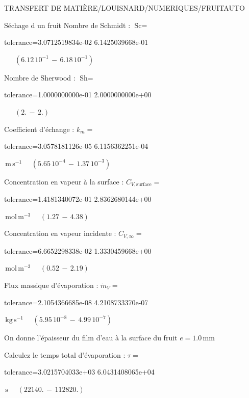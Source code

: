 \documentclass[12pt]{article}
\begin{document}
\begin{quiz}{TRANSFERT DE MATIÈRE/LOUISNARD/NUMERIQUES/FRUITAUTO}
\begin{cloze}{Séchage d un fruit}
Nombre de Schmidt : $\text{Sc} =  $
\begin{numerical}[points=1] 
\item[tolerance={3.0712519834e-02}] 6.1425039668e-01 
\end{numerical} 
 $\,$ 
 $ \quad ( 6.12 \, 10^{-1}  \, - \,  6.18 \, 10^{-1} ) $ 

Nombre de Sherwood : $\text{Sh} =  $
\begin{numerical}[points=2] 
\item[tolerance={1.0000000000e-01}] 2.0000000000e+00 
\end{numerical} 
 $\,$ 
 $ \quad (2. \, - \, 2.) $ 

Coefficient d'échange : $k_m =  $
\begin{numerical}[points=1] 
\item[tolerance={3.0578181126e-05}] 6.1156362251e-04 
\end{numerical} 
 $\,  \mathrm{m}\,  \mathrm{s}^{-1}$ 
 $ \quad ( 5.65 \, 10^{-4}  \, - \,  1.37 \, 10^{-3} ) $ 

Concentration en vapeur à la surface : $C_{V, \text{surface}} =  $
\begin{numerical}[points=2] 
\item[tolerance={1.4181340072e-01}] 2.8362680144e+00 
\end{numerical} 
 $\,  \mathrm{mol}\,  \mathrm{m}^{-3}$ 
 $ \quad (1.27 \, - \, 4.38) $ 

Concentration en vapeur incidente : $C_{V, \infty} =  $
\begin{numerical}[points=2] 
\item[tolerance={6.6652298338e-02}] 1.3330459668e+00 
\end{numerical} 
 $\,  \mathrm{mol}\,  \mathrm{m}^{-3}$ 
 $ \quad (0.52 \, - \, 2.19) $ 

Flux massique d'évaporation : $\dot{m}_V =  $
\begin{numerical}[points=1] 
\item[tolerance={2.1054366685e-08}] 4.2108733370e-07 
\end{numerical} 
 $\,  \mathrm{kg}\,  \mathrm{s}^{-1}$ 
 $ \quad ( 5.95 \, 10^{-8}  \, - \,  4.99 \, 10^{-7} ) $ 

 

On donne l'épaisseur du film d'eau à la surface du fruit $e = 1.0\,  \mathrm{mm} $

Calculez le temps total d'évaporation : $\tau =  $
\begin{numerical}[points=2] 
\item[tolerance={3.0215704033e+03}] 6.0431408065e+04 
\end{numerical} 
 $\,  \mathrm{s}$ 
 $ \quad (22140. \, - \, 112820.) $ 


\end{cloze}
\end{quiz}
\end{document}
